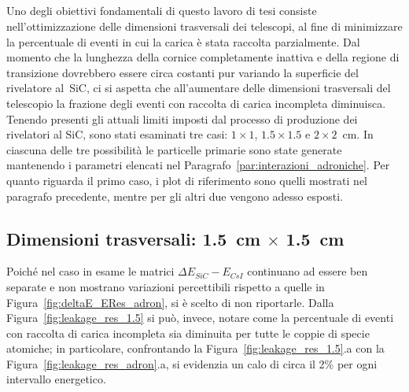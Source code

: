 \subsection{}

Uno degli obiettivi fondamentali di questo lavoro di tesi consiste nell'ottimizzazione delle dimensioni trasversali dei telescopi, al fine di minimizzare la percentuale di eventi in cui la carica è stata raccolta parzialmente. 
Dal momento che la lunghezza della cornice completamente inattiva e della regione di transizione dovrebbero essere circa costanti pur variando la superficie del rivelatore al~SiC, ci si aspetta che all'aumentare delle dimensioni trasversali del telescopio la frazione degli eventi con raccolta di carica incompleta diminuisca.
Tenendo presenti gli attuali limiti imposti dal processo di produzione dei rivelatori al SiC, sono stati esaminati tre casi: $1 \times 1$, $1.5 \times 1.5$ e $2 \times 2$~cm. 
In ciascuna delle tre possibilità le particelle primarie sono state generate mantenendo i parametri elencati nel Paragrafo~\ref{par:interazioni_adroniche}.
Per quanto riguarda il primo caso, i plot di riferimento sono quelli mostrati nel paragrafo precedente, mentre per gli altri due vengono adesso esposti.

\subsection*{Dimensioni trasversali: 1.5~cm $\times$ 1.5~cm}




Poiché nel caso in esame le matrici $\Delta E_{SiC} - E_{CsI}$ continuano ad essere ben separate e non mostrano variazioni percettibili rispetto a quelle in Figura~\ref{fig:deltaE_ERes_adron}, si è scelto di non riportarle.
Dalla Figura~\ref{fig:leakage_res_1.5} si può, invece, notare come la percentuale di eventi con raccolta di carica incompleta sia diminuita per tutte le coppie di specie atomiche; in particolare, confrontando la Figura~\ref{fig:leakage_res_1.5}.a con la Figura~\ref{fig:leakage_res_adron}.a, si evidenzia un calo di circa il 2\% per ogni intervallo energetico.

